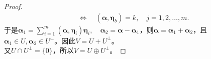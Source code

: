 \begin{enumerate}[1~]
\begin{proof}
\begin{align*}
&\Longleftrightarrow \quad \left( \boldsymbol{\alpha} , \boldsymbol{\eta} _ { b } \right) = k , \quad j = 1,2 , \dots , m.
\end{align*}
于是$\boldsymbol{\alpha} _ { 1 } = \sum _ { i = 1 } ^ { m } \left( \boldsymbol{\alpha} , \boldsymbol{\eta} _ { i } \right) \boldsymbol{\eta} _ { i } , \quad \boldsymbol{\alpha} _ { 2 } = \boldsymbol{\alpha} - \boldsymbol{\alpha} _ { 1 }$，则$\boldsymbol{\alpha} = \boldsymbol{\alpha} _ { 1 } + \boldsymbol{\alpha} _ { 2 }$，且$\boldsymbol{\alpha} _ { 1 } \in U , \boldsymbol{\alpha} _ { 2 } \in U ^ { \perp }$。因此$V = U + U ^ { \perp }$。\\
又$U \cap U ^ { \perp } = \{ 0 \}$，所以$V = U \oplus U ^ { \perp }$。
\end{proof}

\end{enumerate}
\endinput